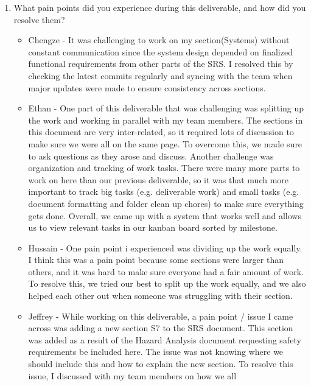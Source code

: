 \begin{enumerate}
\begin{itemize}
  \end{itemize} 
  \item What pain points did you experience during this deliverable, and how did
  you resolve them?
  \begin{itemize}
        \item Chengze - It was challenging to work on my section(Systems) without 
        constant communication since the system design depended on finalized 
        functional requirements from other parts of the SRS. I resolved this 
        by checking the latest commits regularly and syncing with the team when 
        major updates were made to ensure consistency across sections.
        \item Ethan - One part of this deliverable that was challenging was
          splitting up the work and working in parallel with my team members.
          The sections in this document are very inter-related, so it required
          lots of discussion to make sure we were all on the same page. To
          overcome this, we made sure to ask questions as they arose and
          discuss. Another challenge was organization and tracking of work
          tasks. There were many more parts to work on here than our previous
          deliverable, so it was that much more important to track big tasks
          (e.g. deliverable work) and small tasks (e.g. document formatting and
          folder clean up chores) to make sure everything gets done. Overall,
          we came up with a system that works well and allows us to view
          relevant tasks in our kanban board sorted by milestone.
        \item Hussain - One pain point i experienced was dividing up the work
            equally. I think this was a pain point because some sections were
            larger than others, and it was hard to make sure everyone had a fair
            amount of work. To resolve this, we tried our best to split up the
            work equally, and we also helped each other out when someone was
            struggling with their section.
        \item Jeffrey - While working on this deliverable, a pain point / issue
        I came across was adding a new section S7 to the SRS document. This
        section was added as a result of the Hazard Analysis document requesting
        safety requirements be included here. The issue was not knowing
        where we should include this and how to explain the new section.
        To resolve this issue, I discussed with my team members on how we all

\end{itemize}
\end{enumerate}
